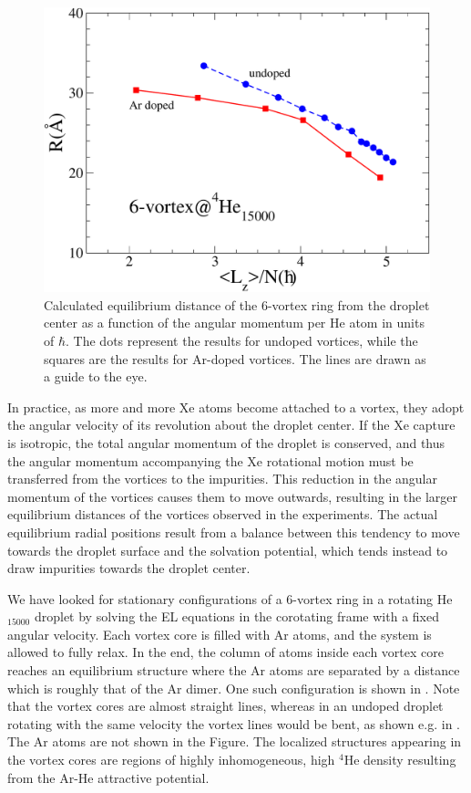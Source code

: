 \begin{figure}[!]
\centerline{\includegraphics[width=0.9\linewidth,clip]{fig14}}
\caption{\label{fig14-capture} 
Calculated equilibrium distance of the 6-vortex ring
from the droplet center as a function of the 
angular momentum per He atom in units of $\hbar$. 
The dots represent the results for undoped vortices, while the squares are the results for 
Ar-doped vortices. The lines are drawn as a guide to the eye.
}
\end{figure}

In practice, as more and more Xe atoms become
attached to a vortex, they adopt the angular velocity of its
revolution about the droplet center. 
If the Xe capture is isotropic, the total angular momentum of the droplet is conserved, and 
thus the angular momentum accompanying the Xe rotational motion must be
transferred from the vortices to the impurities. This reduction in the angular momentum of the
vortices causes them to move outwards, 
resulting in the larger
equilibrium distances of the vortices observed in 
the experiments. The actual equilibrium radial positions
result from a balance between this tendency to 
move towards the droplet surface 
and the solvation potential, 
which tends instead to draw impurities towards the droplet
center.

We have looked for stationary configurations of a 6-vortex ring
in a rotating He$_{15000}$ droplet by solving the
EL equations in the corotating frame with a fixed
angular velocity. Each vortex core is filled with Ar
atoms, and the system is allowed to fully relax.
In the end, the column of atoms inside each vortex core reaches an equilibrium structure 
where the Ar atoms are separated by a distance which  is roughly that of the Ar dimer.
One such configuration is shown in . Note that 
the vortex cores are almost straight lines, whereas in an
undoped droplet rotating with the same velocity 
the vortex lines would be bent, 
as shown  e.g. in .
The Ar atoms are not shown in the Figure.
The localized structures appearing in the vortex cores are 
regions of highly inhomogeneous, high  $^4$He density
resulting from the Ar-He attractive potential.

